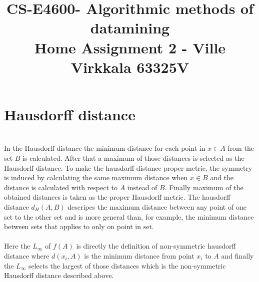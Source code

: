 \documentclass[article,11pt]{article}
\title{CS-E4600- Algorithmic methods of datamining \\ Home Assignment 2 - Ville Virkkala 63325V}
\begin{document}
\date{}
\maketitle

\newpage

\section{Hausdorff  distance}
\\
In the Hausdorff distance the minimum distance for each point in $x \in A$ from
the set $B$ is calculated. After that a maximum of those distances is selected
as the Hausdorff distance. To make the hausdorff distance proper metric, the symmetry
is induced by calculating the same maximum distance when $x \in B$ and the
distance is calculated with respect to $A$ instead of $B$. Finally
maximum of the obtained distances is taken as the proper Hausdorff metric.
The hausdorff distance $d_H(A, B)$ descripes the maximum distance between any
point of one set to the other set and is more general than, for example, the
minimum distance between sets that applies to only on point in set.\\
\\
Here the $L_\infty$ of $f(A)$ is directly the definition of non-symmetric
hausdorff distance where $d(x_i, A)$ is the minimum distance from point $x_i$ to
$A$ and finally the $L_\infty$ selects the largest of those distances which is
the non-symmetric Hausdorff distance described above.\\
\\
\end{document}
